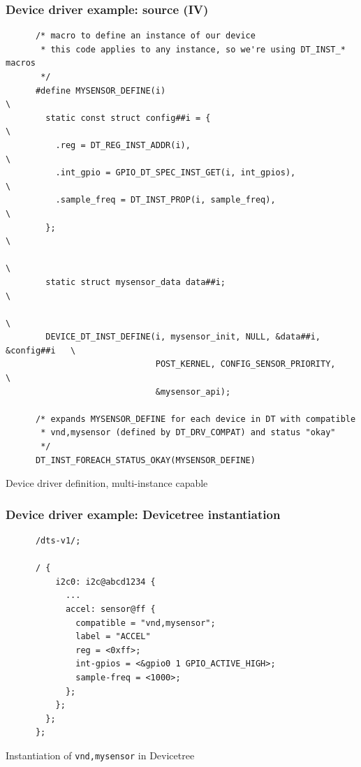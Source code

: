 \documentclass[handout]{beamer}
\begin{document}
\begin{frame}[fragile]
  \frametitle{Device driver example: source (IV)}

  \begin{listing}[H]
    \begin{verbatim}
      /* macro to define an instance of our device
       * this code applies to any instance, so we're using DT_INST_* macros
       */
      #define MYSENSOR_DEFINE(i)                                             \
        static const struct config##i = {                                    \
          .reg = DT_REG_INST_ADDR(i),                                        \
          .int_gpio = GPIO_DT_SPEC_INST_GET(i, int_gpios),                   \
          .sample_freq = DT_INST_PROP(i, sample_freq),                       \
        };                                                                   \
                                                                             \
        static struct mysensor_data data##i;                                 \
                                                                             \
        DEVICE_DT_INST_DEFINE(i, mysensor_init, NULL, &data##i, &config##i   \
                              POST_KERNEL, CONFIG_SENSOR_PRIORITY,           \
                              &mysensor_api);

      /* expands MYSENSOR_DEFINE for each device in DT with compatible
       * vnd,mysensor (defined by DT_DRV_COMPAT) and status "okay"
       */
      DT_INST_FOREACH_STATUS_OKAY(MYSENSOR_DEFINE)
    \end{verbatim}
    \caption{Device driver definition, multi-instance capable}
  \end{listing}
\end{frame}

\begin{frame}[fragile]
  \frametitle{Device driver example: Devicetree instantiation}

  \begin{listing}[H]
    \begin{verbatim}
      /dts-v1/;

      / {
          i2c0: i2c@abcd1234 {
            ...
            accel: sensor@ff {
              compatible = "vnd,mysensor";
              label = "ACCEL"
              reg = <0xff>;
              int-gpios = <&gpio0 1 GPIO_ACTIVE_HIGH>;
              sample-freq = <1000>;
            };
          };
        };
      };
    \end{verbatim}
    \caption{Instantiation of \texttt{vnd,mysensor} in Devicetree}
  \end{listing}
\end{frame}
\end{document}
